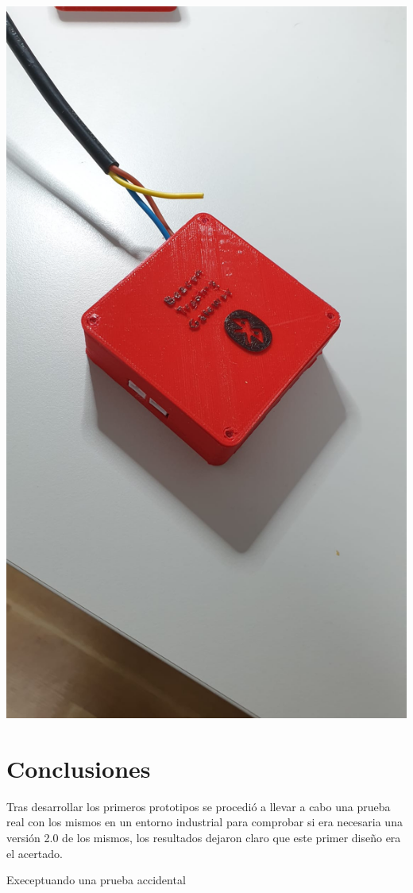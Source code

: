 \documentclass[a4paper ,12pt, onecolumn]{article}
\begin{document}
        \includegraphics[scale=0.1]{../3d_master_2.jpeg}

\section{Conclusiones}
    Tras desarrollar los primeros prototipos se procedió a llevar a cabo una prueba real con los mismos 
    en un entorno industrial para comprobar si era necesaria una versión 2.0 de los mismos, los resultados
    dejaron claro que este primer diseño era el acertado.

    Execeptuando una prueba accidental 
\end{document}
